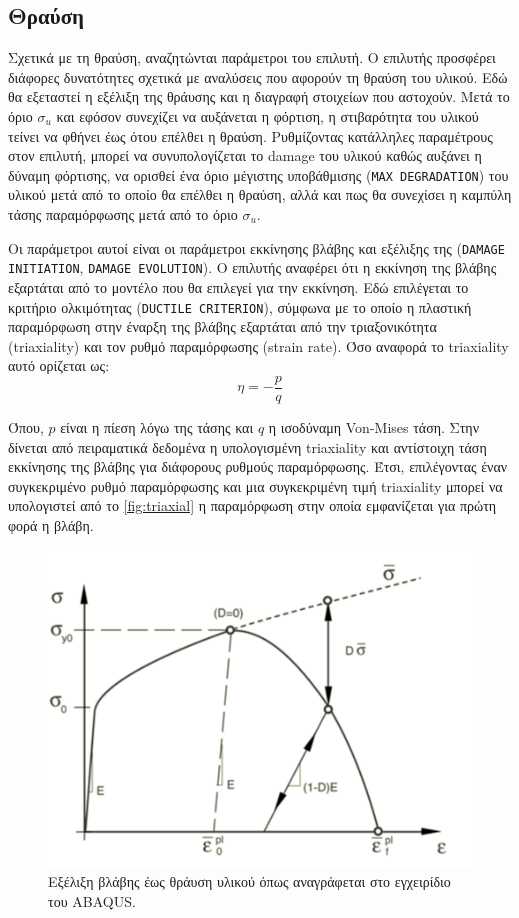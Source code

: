 \documentclass{article}
\begin{document}
\subsection{Θραύση}
Σχετικά με τη θραύση, αναζητώνται παράμετροι του επιλυτή. Ο επιλυτής προσφέρει διάφορες δυνατότητες σχετικά με αναλύσεις που αφορούν τη θραύση του υλικού. Εδώ θα εξεταστεί η εξέλιξη της θράυσης και η διαγραφή στοιχείων που αστοχούν. Μετά το όριο $\sigma_u$ και εφόσον συνεχίζει να αυξάνεται η φόρτιση, η στιβαρότητα του υλικού τείνει να φθήνει έως ότου επέλθει η θραύση. Ρυθμίζοντας κατάλληλες παραμέτρους στον επιλυτή, μπορεί να συνυπολογίζεται το damage του υλικού καθώς αυξάνει η δύναμη φόρτισης, να ορισθεί ένα όριο μέγιστης υποβάθμισης (\texttt{MAX DEGRADATION}) του υλικού μετά από το οποίο θα επέλθει η θραύση, αλλά και πως θα συνεχίσει η καμπύλη τάσης παραμόρφωσης μετά από το όριο $\sigma_u$.
\par Οι παράμετροι αυτοί είναι οι παράμετροι εκκίνησης βλάβης και εξέλιξης της (\texttt{DAMAGE INITIATION}, \texttt{DAMAGE EVOLUTION}). Ο επιλυτής αναφέρει ότι η εκκίνηση της βλάβης εξαρτάται από το μοντέλο που θα επιλεγεί για την εκκίνηση. Εδώ επιλέγεται το κριτήριο ολκιμότητας (\texttt{DUCTILE CRITERION}), σύμφωνα με το οποίο η πλαστική παραμόρφωση στην έναρξη της βλάβης εξαρτάται από την τριαξονικότητα (triaxiality) και τον ρυθμό παραμόρφωσης (strain rate). Όσο αναφορά το triaxiality αυτό ορίζεται ως:
\begin{equation}
    \eta = -\frac{p}{q}
\end{equation}

Όπου, $p$ είναι η πίεση λόγω της τάσης και $q$ η ισοδύναμη Von-Mises τάση. Στην \cite{triaxiality} δίνεται από πειραματικά δεδομένα η υπολογισμένη triaxiality και αντίστοιχη τάση εκκίνησης της βλάβης για διάφορους ρυθμούς παραμόρφωσης. Έτσι, επιλέγοντας έναν συγκεκριμένο ρυθμό παραμόρφωσης και μια συγκεκριμένη τιμή triaxiality μπορεί να υπολογιστεί από το \ref{fig:triaxial} η παραμόρφωση στην οποία εμφανίζεται για πρώτη φορά η βλάβη.
\begin{figure}[H]
    \centering
    \includegraphics[width=0.6\linewidth]{media/abaqDE.png}
    \caption{Εξέλιξη βλάβης έως θράυση υλικού όπως αναγράφεται στο εγχειρίδιο του ABAQUS.}
    \label{fig:abaqDE}
\end{figure}
\end{document}

